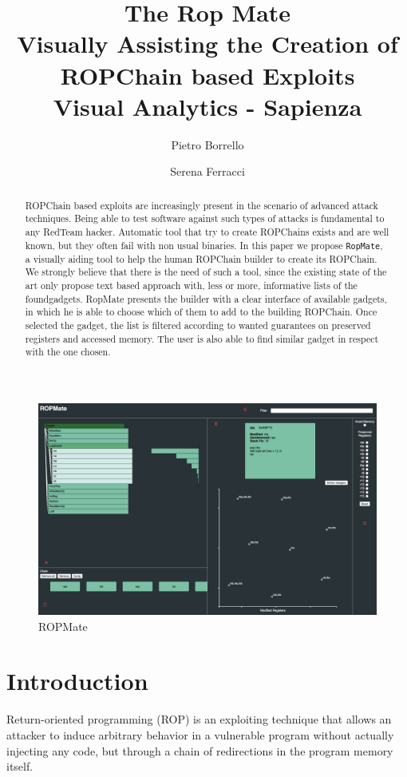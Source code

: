 \documentclass[twocolumn, 11pt]{article}
\title{{\Large \bf The Rop Mate \\ \large Visually Assisting the Creation of ROPChain based Exploits}  \\{\medskip\normalfont\normalsize  Visual Analytics -  Sapienza}}
\author{
{\rm Pietro Borrello}
\and
{\rm Serena Ferracci}}
\date{}
\begin{document}
    \maketitle
    \begin{figure}[htb]
      \centering
      \includegraphics[width=0.9\linewidth]{ropmate-screen}
      \caption{ROPMate}\label{fig:ropmate}
    \end{figure}

\begin{abstract}

ROPChain based exploits are increasingly present in the scenario of advanced attack techniques.
Being able to test software against such types of attacks is fundamental to any RedTeam hacker. Automatic tool that try to create ROPChains exists and are well known, but they often fail with non usual binaries.
In this paper we propose \texttt{RopMate}, a visually aiding tool to help the human ROPChain builder to create its ROPChain. We strongly believe that there is the need of such a tool, since the existing state of the art only propose text based approach with, less or more, informative lists of the foundgadgets.
RopMate presents the builder with a clear interface of available gadgets, in which he is able to choose which of them to add to the building ROPChain. Once selected the gadget, the list is filtered according to wanted guarantees on preserved registers and accessed memory. The user is also able to find similar gadget in respect with the one chosen.
\end{abstract}

\twocolumn
\section{Introduction}
Return-oriented programming (ROP) is an exploiting technique that allows an attacker to induce arbitrary behavior in a vulnerable program without actually injecting any code, but through a chain of redirections in the program memory itself. \cite{rop}
\end{document}
